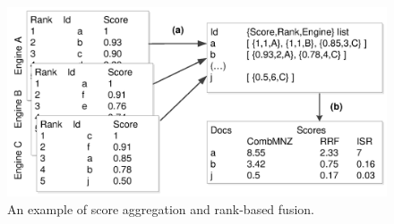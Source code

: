 \begin{figure}
\centering
\includegraphics[height=0.7\paperheight]{learning-to-rank}
\vspace*{-0.35cm}
\caption
  {An example of score aggregation and rank-based fusion.
   \cite[Figure 3]{mourao2014inverse}}
\end{figure}